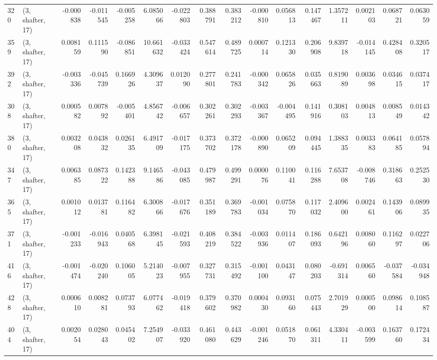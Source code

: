 \begin{tabular}{llrrrrrrrrrrrrrr}
320 &  (3, shafter, 17) &  -0.000838 & -0.011545 & -0.005258 &    6.085066 & -0.022803 &   0.388791 &  0.383212 & -0.000810 &  0.056813 &  0.147467 &    1.357211 &  0.002103 &  0.068721 &  0.063059 \\
359 &  (3, shafter, 17) &   0.008159 &  0.111590 & -0.086851 &   10.661632 & -0.033424 &   0.547614 &  0.489725 &  0.000714 &  0.121330 &  0.206908 &    9.839718 & -0.014145 &  0.428408 &  0.320517 \\
392 &  (3, shafter, 17) &  -0.003336 & -0.045739 &  0.166926 &    4.309637 &  0.012090 &   0.277801 &  0.241783 & -0.000342 &  0.065826 &  0.035663 &    0.819089 &  0.003698 &  0.034615 &  0.037417 \\
308 &  (3, shafter, 17) &   0.000582 &  0.007892 & -0.005401 &    4.856742 & -0.006657 &   0.302261 &  0.302293 & -0.003367 & -0.004495 &  0.141916 &    0.308103 &  0.004813 &  0.008549 &  0.014342 \\
380 &  (3, shafter, 17) &   0.003208 &  0.043832 &  0.026135 &    6.491709 & -0.017175 &   0.373702 &  0.372178 & -0.000890 &  0.065209 &  0.094445 &    1.388335 &  0.003383 &  0.064185 &  0.057894 \\
347 &  (3, shafter, 17) &   0.006385 &  0.087322 &  0.142388 &    9.146586 & -0.043085 &   0.479987 &  0.499291 &  0.000076 &  0.110041 &  0.116288 &    7.653708 & -0.008746 &  0.318663 &  0.252530 \\
365 &  (3, shafter, 17) &   0.001012 &  0.013781 &  0.116482 &    6.300866 & -0.017676 &   0.351189 &  0.369783 & -0.001034 &  0.075870 &  0.117032 &    2.409600 &  0.002461 &  0.143906 &  0.089935 \\
371 &  (3, shafter, 17) &  -0.001233 & -0.016943 &  0.040568 &    6.398145 & -0.021593 &   0.408219 &  0.384522 & -0.003936 &  0.011407 &  0.186093 &    0.642196 &  0.008060 &  0.116297 &  0.022706 \\
416 &  (3, shafter, 17) &  -0.001474 & -0.020240 &  0.106005 &    5.214023 & -0.007955 &   0.327731 &  0.315492 & -0.001100 &  0.043147 &  0.080203 &   -0.691314 &  0.006560 & -0.037584 & -0.034948 \\
428 &  (3, shafter, 17) &   0.000610 &  0.008281 &  0.073793 &    6.077462 & -0.019418 &   0.379602 &  0.370982 &  0.000430 &  0.093160 &  0.075443 &    2.701929 &  0.000500 &  0.098614 &  0.108587 \\
404 &  (3, shafter, 17) &   0.002054 &  0.028043 &  0.045402 &    7.254907 & -0.033920 &   0.461080 &  0.443629 & -0.001246 &  0.051870 &  0.061311 &    4.330411 & -0.003599 &  0.163760 &  0.172434 \\

\end{tabular}
